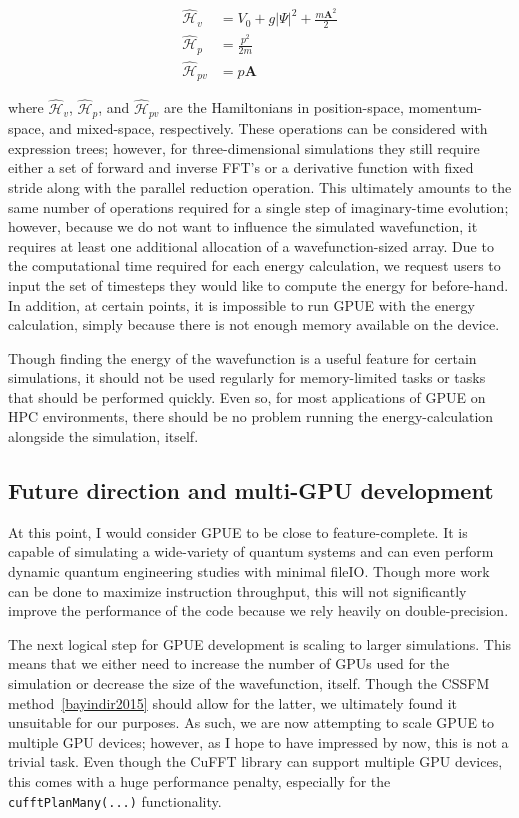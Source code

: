 \begin{align}
\mathcal{\hat H}_v &= V_0 + g|\Psi|^2 + \frac{m\mathbf{A}^2}{2} \\
\mathcal{\hat H}_p &= \frac{p^2}{2m} \\
\mathcal{\hat H}_{pv} &= p\mathbf{A}
\end{align}

\noindent where $\mathcal{\hat H}_v$, $\mathcal{\hat H}_p$, and $\mathcal{\hat H}_{pv}$ are the Hamiltonians in position-space, momentum-space, and mixed-space, respectively.
These operations can be considered with expression trees; however, for three-dimensional simulations they still require either a set of forward and inverse FFT's or a derivative function with fixed stride along with the parallel reduction operation.
This ultimately amounts to the same number of operations required for a single step of imaginary-time evolution; however, because we do not want to influence the simulated wavefunction, it requires at least one additional allocation of a wavefunction-sized array.
Due to the computational time required for each energy calculation, we request users to input the set of timesteps they would like to compute the energy for before-hand.
In addition, at certain points, it is impossible to run GPUE with the energy calculation, simply because there is not enough memory available on the device.

Though finding the energy of the wavefunction is a useful feature for certain simulations, it should not be used regularly for memory-limited tasks or tasks that should be performed quickly.
Even so, for most applications of GPUE on HPC environments, there should be no problem running the energy-calculation alongside the simulation, itself.

\subsection{Future direction and multi-GPU development}
\label{sec:multiGPU}

At this point, I would consider GPUE to be close to feature-complete.
It is capable of simulating a wide-variety of quantum systems and can even perform dynamic quantum engineering studies with minimal fileIO.
Though more work can be done to maximize instruction throughput, this will not significantly improve the performance of the code because we rely heavily on double-precision.

The next logical step for GPUE development is scaling to larger simulations.
This means that we either need to increase the number of GPUs used for the simulation or decrease the size of the wavefunction, itself.
Though the CSSFM method~\ref{bayindir2015} should allow for the latter, we ultimately found it unsuitable for our purposes.
As such, we are now attempting to scale GPUE to multiple GPU devices; however, as I hope to have impressed by now, this is not a trivial task.
Even though the CuFFT library can support multiple GPU devices, this comes with a huge performance penalty, especially for the \texttt{cufftPlanMany(...)} functionality.

